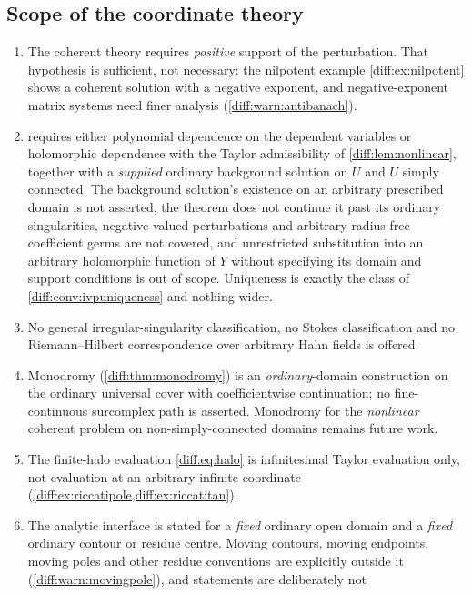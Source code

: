 \documentclass[11pt,letterpaper]{article}
\numberwithin{equation}{section}
\theoremstyle{definition}
\theoremstyle{remark}
\begin{document}
\subsection{Scope of the coordinate theory}
\label{diff:sub:nc:coordinatescope}

\begin{enumerate}[label=\textup{N\arabic*.},leftmargin=3.0em,itemsep=0.35em,start=39]
\item The coherent theory requires \emph{positive} support of the
perturbation. That hypothesis is sufficient, not necessary: the nilpotent
example \cref{diff:ex:nilpotent} shows a coherent solution with a negative
exponent, and negative-exponent matrix systems need finer analysis
(\cref{diff:warn:antibanach}).
\item {} requires either polynomial dependence on the
dependent variables or holomorphic dependence with the Taylor admissibility of
\cref{diff:lem:nonlinear}, together with a \emph{supplied} ordinary background
solution on $U$ and $U$ simply connected. The background solution's existence
on an arbitrary prescribed domain is not asserted, the theorem does not
continue it past its ordinary singularities, negative-valued perturbations and
arbitrary radius-free coefficient germs are not covered, and unrestricted
substitution into an arbitrary holomorphic function of $Y$ without specifying
its domain and support conditions is out of scope. Uniqueness is exactly the
class of \cref{diff:conv:ivpuniqueness} and nothing wider.
\item No general irregular-singularity classification, no Stokes
classification and no Riemann--Hilbert correspondence over arbitrary Hahn
fields is offered.
\item Monodromy (\cref{diff:thm:monodromy}) is an \emph{ordinary}-domain
construction on the ordinary universal cover with coefficientwise
continuation; no fine-continuous surcomplex path is asserted. Monodromy for
the \emph{nonlinear} coherent problem on non-simply-connected domains remains
future work.
\item The finite-halo evaluation \cref{diff:eq:halo} is infinitesimal Taylor
evaluation only, not evaluation at an arbitrary infinite coordinate
(\cref{diff:ex:riccatipole,diff:ex:riccatitan}).
\item The analytic interface is stated for a \emph{fixed} ordinary open
domain and a \emph{fixed} ordinary contour or residue centre. Moving contours,
moving endpoints, moving poles and other residue conventions are explicitly
outside it (\cref{diff:warn:movingpole}), and statements are deliberately not

\end{enumerate}
\end{document}
